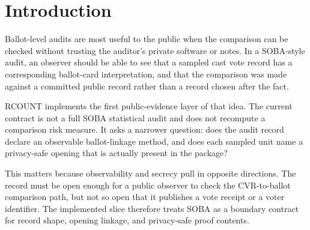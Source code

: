 \section{Introduction}

Ballot-level audits are most useful to the public when the comparison can be
checked without trusting the auditor's private software or notes. In a
SOBA-style audit, an observer should be able to see that a sampled cast vote
record has a corresponding ballot-card interpretation, and that the comparison
was made against a committed public record rather than a record chosen after
the fact.

RCOUNT implements the first public-evidence layer of that idea. The current
contract is not a full SOBA statistical audit and does not recompute a
comparison risk measure. It asks a narrower question: does the audit record
declare an observable ballot-linkage method, and does each sampled unit name a
privacy-safe opening that is actually present in the package?

This matters because observability and secrecy pull in opposite directions.
The record must be open enough for a public observer to check the CVR-to-ballot
comparison path, but not so open that it publishes a vote receipt or a voter
identifier. The implemented slice therefore treats SOBA as a boundary contract
for record shape, opening linkage, and privacy-safe proof contents.
